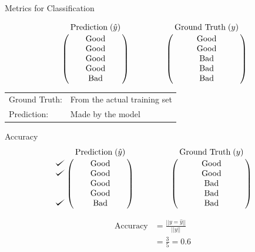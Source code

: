 \documentclass[usenames,dvipsnames]{beamer}
\begin{document}
\begin{frame}{Metrics for Classification}



$$\bordermatrix{&\text{Prediction}\;(\hat{y})\cr
                &\text{Good}\cr
                &\text{Good}\cr
                &\text{Good}\cr
                &\text{Good}\cr
                &\text{Bad}}
                \qquad \qquad
   \bordermatrix{&\text{Ground Truth}\;(y)\cr
                &\text{Good}\cr
                &\text{Good}\cr
                &\text{Bad}\cr
                &\text{Bad}\cr
                &\text{Bad}}
$$

\vspace{1cm}

\begin{tabular}{ll}
Ground Truth: & From the actual training set \\ 
Prediction: & Made by the model \\ 
\end{tabular}

\end{frame}

\begin{frame}{Accuracy}
$$
\bordermatrix{&\text{Prediction}\;(\hat{y})\cr
               \checkmark&\text{Good}\cr
               \checkmark&\text{Good}\cr
                &\text{Good}\cr
                &\text{Good}\cr
               \checkmark&\text{Bad}}
\qquad \qquad
\bordermatrix{&\text{Ground Truth}\;(y)\cr
                &\text{Good}\cr
                &\text{Good}\cr
                &\text{Bad}\cr
                &\text{Bad}\cr
                &\text{Bad}}
$$

\pause \begin{align*}
\text{Accuracy} &= \frac{||y = \hat{y}||}{||y||} \\ 
&= \frac{3}{5} = 0.6
\end{align*}

\end{frame}
\end{document}

